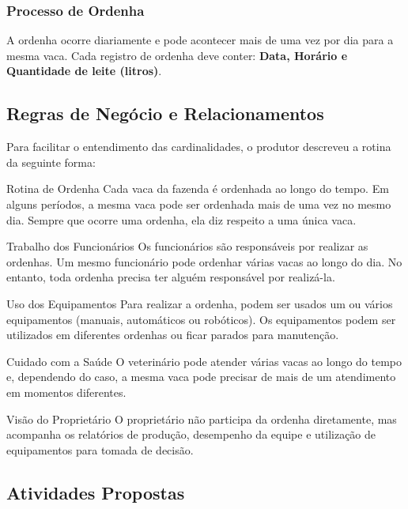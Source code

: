 \subsubsection{Processo de Ordenha}
A ordenha ocorre diariamente e pode acontecer mais de uma vez por dia para a mesma vaca. Cada registro de ordenha deve conter: \textbf{Data, Horário e Quantidade de leite (litros)}.

\subsection{Regras de Negócio e Relacionamentos}

Para facilitar o entendimento das cardinalidades, o produtor descreveu a rotina da seguinte forma:

\begin{block}{Rotina de Ordenha}
Cada vaca da fazenda é ordenhada ao longo do tempo. Em alguns períodos, a mesma vaca pode ser ordenhada mais de uma vez no mesmo dia. Sempre que ocorre uma ordenha, ela diz respeito a uma única vaca.
\end{block}

\begin{block}{Trabalho dos Funcionários}
Os funcionários são responsáveis por realizar as ordenhas. Um mesmo funcionário pode ordenhar várias vacas ao longo do dia. No entanto, toda ordenha precisa ter alguém responsável por realizá-la.
\end{block}

\begin{block}{Uso dos Equipamentos}
Para realizar a ordenha, podem ser usados um ou vários equipamentos (manuais, automáticos ou robóticos). Os equipamentos podem ser utilizados em diferentes ordenhas ou ficar parados para manutenção.
\end{block}

\begin{block}{Cuidado com a Saúde}
O veterinário pode atender várias vacas ao longo do tempo e, dependendo do caso, a mesma vaca pode precisar de mais de um atendimento em momentos diferentes.
\end{block}

\begin{block}{Visão do Proprietário}
O proprietário não participa da ordenha diretamente, mas acompanha os relatórios de produção, desempenho da equipe e utilização de equipamentos para tomada de decisão.
\end{block}

\subsection{Atividades Propostas}

